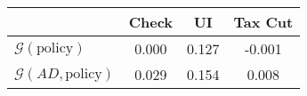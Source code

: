 \begin{tabular}{@{}lccc@{}} 
\toprule 
                          & Check      & UI    & Tax Cut    \\  \midrule 
$\mathcal{G}(\text{policy})$ & 0.000  & 0.127  & -0.001     \\ 
$\mathcal{G}(AD,\text{policy})$ & 0.029  & 0.154  & 0.008     \\ 
\end{tabular}  
